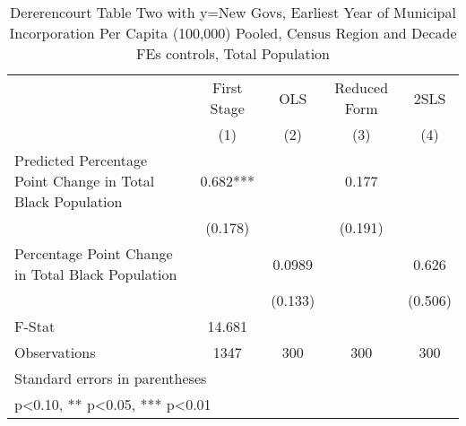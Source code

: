 \begin{table}[htbp]\centering
\def\sym#1{\ifmmode^{#1}\else\(^{#1}\)\fi}
\caption{Dererencourt Table Two with y=New Govs, Earliest Year of Municipal Incorporation Per Capita (100,000) Pooled, Census Region and Decade FEs controls, Total Population}
\begin{tabular}{l*{4}{c}}
\toprule
                    & First Stage   &         OLS   &Reduced Form   &        2SLS   \\
                    &\multicolumn{1}{c}{(1)}   &\multicolumn{1}{c}{(2)}   &\multicolumn{1}{c}{(3)}   &\multicolumn{1}{c}{(4)}   \\
\midrule
Predicted Percentage Point Change in Total Black Population&       0.682***&               &       0.177   &               \\
                    &     (0.178)   &               &     (0.191)   &               \\
\addlinespace
Percentage Point Change in Total Black Population&               &      0.0989   &               &       0.626   \\
                    &               &     (0.133)   &               &     (0.506)   \\
\midrule
F-Stat              &      14.681   &               &               &               \\
Observations        &        1347   &         300   &         300   &         300   \\
\bottomrule
\multicolumn{5}{l}{\footnotesize Standard errors in parentheses}\\
\multicolumn{5}{l}{\footnotesize * p<0.10, ** p<0.05, *** p<0.01}\\
\end{tabular}
\end{table}
